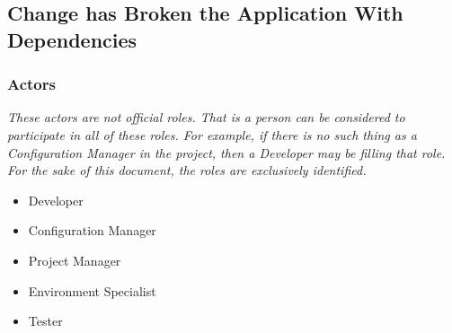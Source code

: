 \documentclass[12pt,notitlepage]{article}
\begin{document}
\subsection{Change has Broken the Application With Dependencies}
\subsubsection{Actors}
\emph{These actors are not official roles. That is a person can be considered to
participate in all of these roles. For example, if there is no such thing as a Configuration
Manager in the project, then a Developer may be filling that role. For the sake of
this document, the roles are exclusively identified.}
\begin{itemize}
\item Developer
\item Configuration Manager
\item Project Manager
\item Environment Specialist
\item Tester
\end{itemize}
\end{document}
